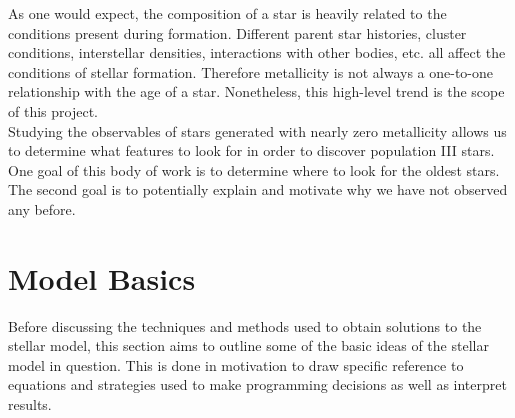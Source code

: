 \documentclass[11pt]{article}
\begin{document}
    As one would expect, the composition of a star is heavily related to the conditions present during formation. Different parent star histories, cluster conditions, interstellar densities, interactions with other bodies, etc. all affect the conditions of stellar formation. Therefore metallicity is not always a one-to-one relationship with the age of a star. Nonetheless, this high-level trend is the scope of this project. \\

    Studying the observables of stars generated with nearly zero metallicity allows us to determine what features to look for in order to discover population III stars. One goal of this body of work is to determine where to look for the oldest stars. The second goal is to potentially explain and motivate why we have not observed any before.
    \section{Model Basics}
    \label{sec:modelbasics}
    Before discussing the techniques and methods used to obtain solutions to the stellar model, this section aims to outline some of the basic ideas of the stellar model in question. This is done in motivation to draw specific reference to equations and strategies used to make programming decisions as well as interpret results.\\
\end{document}
